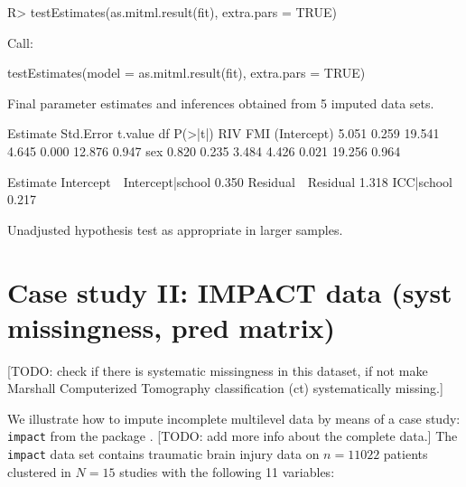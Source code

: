 \documentclass[
]{jss}
\begin{document}
\begin{CodeChunk}
\begin{CodeInput}
R> testEstimates(as.mitml.result(fit), extra.pars = TRUE)
\end{CodeInput}
\begin{CodeOutput}

Call:

testEstimates(model = as.mitml.result(fit), extra.pars = TRUE)

Final parameter estimates and inferences obtained from 5 imputed data sets.

             Estimate Std.Error   t.value        df   P(>|t|)       RIV       FMI 
(Intercept)     5.051     0.259    19.541     4.645     0.000    12.876     0.947 
sex             0.820     0.235     3.484     4.426     0.021    19.256     0.964 

                            Estimate 
Intercept~~Intercept|school    0.350 
Residual~~Residual             1.318 
ICC|school                     0.217 

Unadjusted hypothesis test as appropriate in larger samples.
\end{CodeOutput}
\end{CodeChunk}

\hypertarget{case-study-ii-impact-data-syst-missingness-pred-matrix}{%
\section{Case study II: IMPACT data (syst missingness, pred
matrix)}\label{case-study-ii-impact-data-syst-missingness-pred-matrix}}

{[}TODO: check if there is systematic missingness in this dataset, if
not make Marshall Computerized Tomography classification (ct)
systematically missing.{]}

We illustrate how to impute incomplete multilevel data by means of a
case study: \texttt{impact} from the  package
\citep[empirical data on traumatic brain injuries, \(n = 11,022\) units
across \(N = 15\) clusters,][]{metamisc}. {[}TODO: add more info about
the complete data.{]} The \texttt{impact} data set contains traumatic
brain injury data on \(n = 11022\) patients clustered in \(N = 15\)
studies with the following 11 variables:
\end{document}
